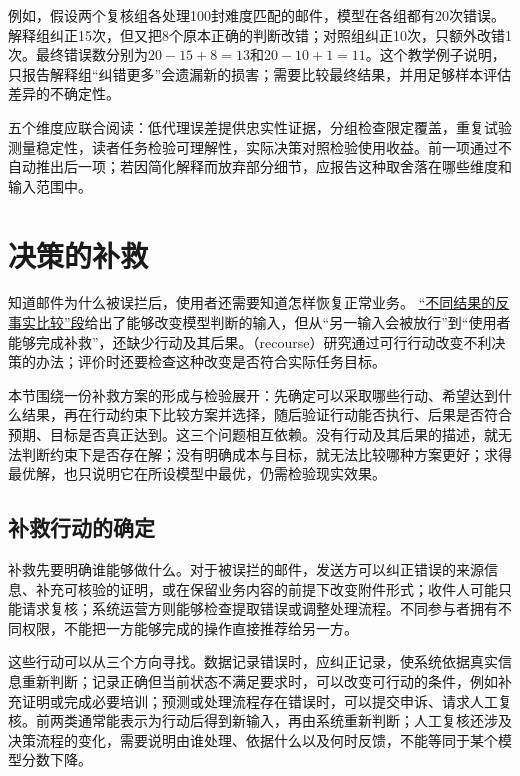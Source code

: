 例如，假设两个复核组各处理100封难度匹配的邮件，模型在各组都有20次错误。解释组纠正15次，但又把8个原本正确的判断改错；对照组纠正10次，只额外改错1次。最终错误数分别为$20-15+8=13$和$20-10+1=11$。这个教学例子说明，只报告解释组“纠错更多”会遗漏新的损害；需要比较最终结果，并用足够样本评估差异的不确定性。

五个维度应联合阅读：低代理误差提供忠实性证据，分组检查限定覆盖，重复试验测量稳定性，读者任务检验可理解性，实际决策对照检验使用收益。前一项通过不自动推出后一项；若因简化解释而放弃部分细节，应报告这种取舍落在哪些维度和输入范围中。

\section{决策的补救}
\label{sec:interpretability-recourse}

知道邮件为什么被误拦后，使用者还需要知道怎样恢复正常业务。
\hyperref[sec:interpretability-local-counterfactual]{“不同结果的反事实比较”段}给出了能够改变模型判断的输入，但从“另一输入会被放行”到“使用者能够完成补救”，还缺少行动及其后果。（recourse）研究通过可行行动改变不利决策的办法；评价时还要检查这种改变是否符合实际任务目标。

本节围绕一份补救方案的形成与检验展开：先确定可以采取哪些行动、希望达到什么结果，再在行动约束下比较方案并选择，随后验证行动能否执行、后果是否符合预期、目标是否真正达到。这三个问题相互依赖。没有行动及其后果的描述，就无法判断约束下是否存在解；没有明确成本与目标，就无法比较哪种方案更好；求得最优解，也只说明它在所设模型中最优，仍需检验现实效果。

\subsection{补救行动的确定}
\label{sec:interpretability-recourse-target}

补救先要明确谁能够做什么。对于被误拦的邮件，发送方可以纠正错误的来源信息、补充可核验的证明，或在保留业务内容的前提下改变附件形式；收件人可能只能请求复核；系统运营方则能够检查提取错误或调整处理流程。不同参与者拥有不同权限，不能把一方能够完成的操作直接推荐给另一方。

这些行动可以从三个方向寻找。数据记录错误时，应纠正记录，使系统依据真实信息重新判断；记录正确但当前状态不满足要求时，可以改变可行动的条件，例如补充证明或完成必要培训；预测或处理流程存在错误时，可以提交申诉、请求人工复核。前两类通常能表示为行动后得到新输入，再由系统重新判断；人工复核还涉及决策流程的变化，需要说明由谁处理、依据什么以及何时反馈，不能等同于某个模型分数下降。

